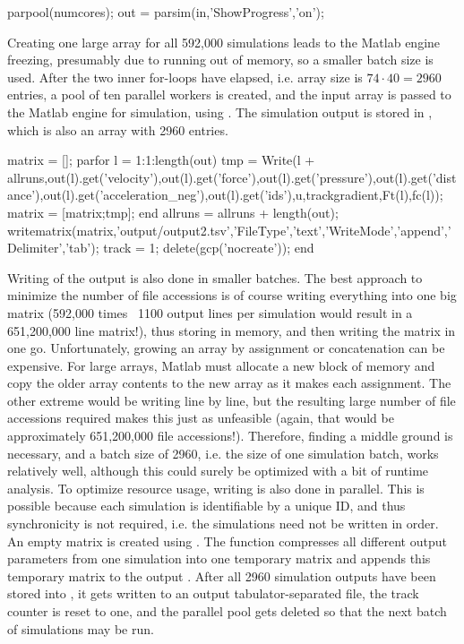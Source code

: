 \bigskip
\begin{python}
	parpool(numcores);
	out = parsim(in,'ShowProgress','on');
\end{python}
\bigskip

\noindent
Creating one large array for all 592,000 simulations leads to the Matlab engine freezing, presumably due to running out of memory, so a smaller batch size is used. After the two inner for-loops have elapsed, i.e. array size is $74 \cdot 40 = 2960$ entries, a pool of ten parallel workers is created, and the input array is passed to the Matlab engine for simulation, using . The simulation output is stored in , which is also an array with 2960 entries.

\bigskip
\begin{python}
	matrix = [];
	parfor l = 1:1:length(out)
		tmp = Write(l + allruns,out(l).get('velocity'),out(l).get('force'),out(l).get('pressure'),out(l).get('distance'),out(l).get('acceleration_neg'),out(l).get('ids'),u,trackgradient,Ft(l),fc(l));
		matrix = [matrix;tmp];
	end
	allruns = allruns + length(out);
	writematrix(matrix,'output/output2.tsv','FileType','text','WriteMode','append','Delimiter','tab');
	track = 1;
	delete(gcp('nocreate'));
end
\end{python}
\bigskip

\noindent
Writing of the output is also done in smaller batches. The best approach to minimize the number of file accessions is of course writing everything into one big matrix (592,000 times ~1100 output lines per simulation would result in a 651,200,000 line matrix!), thus storing in memory, and then writing the matrix in one go. Unfortunately, growing an array by assignment or concatenation can be expensive. For large arrays, Matlab must allocate a new block of memory and copy the older array contents to the new array as it makes each assignment. The other extreme would be writing line by line, but the resulting large number of file accessions required makes this just as unfeasible (again, that would be approximately 651,200,000 file accessions!). Therefore, finding a middle ground is necessary, and a batch size of 2960, i.e. the size of one simulation batch, works relatively well, although this could surely be optimized with a bit of runtime analysis. To optimize resource usage, writing is also done in parallel. This is possible because each simulation is identifiable by a unique ID, and thus synchronicity is not required, i.e. the simulations need not be written in order. An empty matrix is created using . The  function compresses all different output parameters from one simulation into one temporary matrix  and appends this temporary matrix to the output . After all 2960 simulation outputs have been stored into , it gets written to an output tabulator-separated file, the track counter is reset to one, and the parallel pool gets deleted so that the next batch of simulations may be run.

